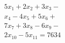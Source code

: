 \documentclass[a4paper]{article}
\begin{document}
    \begin{multline}
    5x_1 + 2x_2 + 3x_3 -\\
    x_4 - 4x_5 + 5x_6 +\\
    7x_7 + 3x_8 - 6x_9 -\\
    2x_{10} - 5x_{11} = 7634
    \end{multline}
\end{document}
